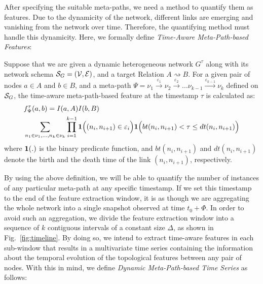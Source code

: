 After specifying the suitable meta-paths, we need a method to quantify them as features. Due to the dynamicity of the network, different links are emerging and vanishing from the network over time. Therefore, the quantifying method must handle this dynamicity. Here, we formally define \emph{Time-Aware Meta-Path-based Features}:

\begin{definition}
	Suppose that we are given a dynamic heterogeneous network $G^{\tau}$ along with its network schema $\mathcal{S}_G=(\mathcal{V}, \mathcal{E})$, and a target Relation $A\rightsquigarrow B$. For a given pair of nodes $a\in A$ and $b\in B$, and a meta-path $\Psi=\nu_1\xrightarrow{\varepsilon_1}\nu_2\xrightarrow{\varepsilon_2}\dots\nu_{k-1}\xrightarrow{\varepsilon_{k-1}}\nu_k$ defined on $\mathcal{S}_G$, the time-aware meta-path-based feature at the timestamp $\tau$ is calculated as:
	\begin{equation*}
		\begin{split}
			&f_{\Psi}^\tau(a,b)=I(a,A)I(b,B)\\
			&\sum_{n_1\in\nu_1,\dots,n_k\in\nu_k}\prod_{i=1}^{k-1}\mathbf{1}\Big((n_i,n_{i+1})\in\varepsilon_i\Big)\mathbf{1}\Big(bt(n_i,n_{i+1}) < \tau \le dt(n_i,n_{i+1})\Big)
		\end{split}
	\end{equation*}
	where $\mathbf{1}(.)$ is the binary predicate function, and $bt(n_i,n_{i+1})$ and $dt(n_i,n_{i+1})$ denote the birth and the death time of the link $(n_i,n_{i+1})$, respectively.
\end{definition}

By using the above definition, we will be able to quantify the number of instances of any particular meta-path at any specific timestamp. If we set this timestamp to the end of the feature extraction window, it is as though we are aggregating the whole network into a single snapshot observed at time $t_0+\Phi$. In order to avoid such an aggregation, we divide the feature extraction window into a sequence of $k$ contiguous intervals of a constant size $\Delta$, as shown in Fig.~\ref{fig:timeline}. By doing so, we intend to extract time-aware features in each sub-window that results in a multivariate time series containing the information about the temporal evolution of the topological features between any pair of nodes. With this in mind, we define \emph{Dynamic Meta-Path-based Time Series} as follows:

